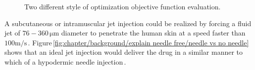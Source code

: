         \begin{figure}[!ht]
            \centering
            \qquad
            \caption{
                Two different style of optimization objective function evaluation.
            }   \label{fig:chapter/background/explain needle free}
        \end{figure}
        
        A subcutaneous or intramuscular jet injection could be realized by forcing a fluid jet of $\mathrm{76-360\,\mu m}$  diameter to penetrate the human skin at a speed faster than $\mathrm{100 m/s}$\,\cite{mitragotri2006,Hogan2006}. Figure\,\ref{fig:chapter/background/explain needle free/needle vs no needle} shows that an ideal jet injection would deliver the drug in a similar manner to which of a hypodermic needle injection\,\cite{InsuJet2013}.
        
        
